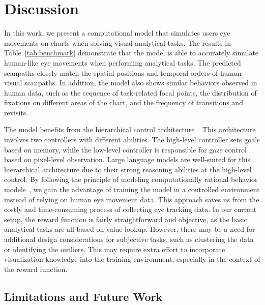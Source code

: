 \section{Discussion}


In this work, we present a computational model that simulates users eye movements on charts when solving visual analytical tasks. 
The results in Table~\ref{tab:benchmark} demonstrate that the model is able to accurately simulate human-like eye movements when performing analytical tasks. The predicted scanpaths closely match the spatial positions and temporal orders of human visual scanpaths. 
In addition, the model also shows similar behaviors observed in human data, such as the sequence of task-related focal points, the distribution of fixations on different areas of the chart, and the frequency of transitions and revisits.

The model benefits from the hierarchical control architecture~\cite{eppe2022intelligent}. This architecture involves two controllers with different abilities. The high-level controller sets goals based on memory, while the low-level controller is responsible for gaze control based on pixel-level observation. Large language models are well-suited for this hierarchical architecture due to their strong reasoning abilities at the high-level control.
By following the principle of modeling computationally rational behavior models~\cite{chandramouli2024workflow, oulasvirta2022computational}, we gain the advantage of training the model in a controlled environment instead of relying on human eye movement data. This approach saves us from the costly and time-consuming process of collecting eye tracking data.
In our current setup, the reward function is fairly straightforward and objective, as the basic analytical tasks are all based on value lookup. However, there may be a need for additional design considerations for subjective tasks, such as clustering the data or identifying the outliers. This may require extra effort to incorporate visualization knowledge into the training environment, especially in the context of the reward function.


\subsection{Limitations and Future Work}

